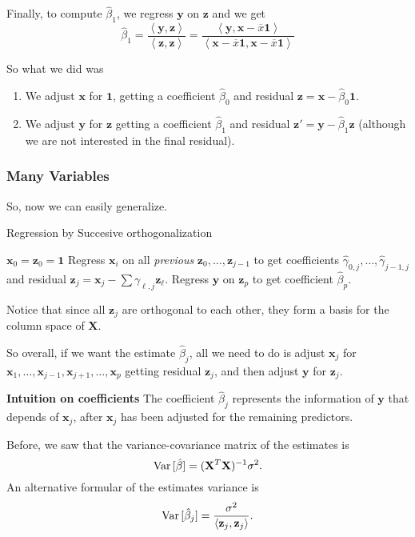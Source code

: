 \documentclass[11pt]{article}
\theoremstyle{definition}
\newcommand{\XX}{\mathbf{X}}
\newcommand{\xx}{\mathbf{x}}
\newcommand{\zz}{\mathbf{z}}
\newcommand{\yy}{\mathbf{y}}
\newcommand{\onevec}{\mathbf{1}}
\newcommand{\ip}[2]{\ensuremath{\left\langle#1, #2\right\rangle}}
\begin{document}
Finally, to compute $\hat\beta_1$, we regress $\yy$ on $\zz$ and we get
\[\hat\beta_1=\frac{\ip\yy\zz}{\ip\zz\zz}=\frac{\ip\yy{\xx-\overline{x}\onevec}}{\ip{\xx-\overline{x}\onevec}{\xx-\overline{x}\onevec}}\]

So what we did was
\begin{enumerate}
	\item We adjust $\xx$ for $\onevec$, getting a coefficient $\hat\beta_0$ and
	      residual $\zz=\xx-\hat\beta_0\onevec$.
	\item We adjust $\yy$ for $\zz$ getting a coefficient $\hat\beta_1$ and
	      residual $\zz'=\yy-\hat\beta_1\zz$ (although we are not interested in the
	      final residual).
\end{enumerate}

\subsubsection{Many Variables}
So, now we can easily generalize.
\begin{algorithm}
	\caption{Regression by Succesive orthogonalization}\label{alg:Gram-Schmidt}
	\begin{algorithmic}
		\State $\xx_0=\zz_0=\onevec$
		\State Regress $\xx_i$ on all \emph{previous} $\zz_0,\ldots,\zz_{j-1}$ 
		to get coefficients $\hat\gamma_{0,j},\ldots,\hat\gamma_{j-1,j}$ and
		residual $\zz_j=\xx_j-\sum \gamma_{\ell,j}\zz_\ell$.
		\EndFor
		\State Regress $\yy$ on $\zz_p$ to get coefficient $\hat\beta_p$.
	\end{algorithmic}
\end{algorithm}

Notice that since all $\zz_j$ are orthogonal to each other, they form a basis
for the column space of $\XX$.

So overall, if we want the estimate $\hat\beta_j$, all we need to do is adjust
$\xx_j$ for $\xx_1,\ldots,\xx_{j-1},\xx_{j+1},\ldots,\xx_p$ getting residual
$\zz_j$, and then adjust $\yy$ for $\zz_j$.

\begin{shaded}
	\textbf{Intuition on coefficients} \newline
	The coefficient $\hat\beta_j$ represents the information of $\yy$ that
	depends of $\xx_j$, after $\xx_j$ has been adjusted for the remaining
	predictors.
\end{shaded}

Before, we saw that the variance-covariance matrix of the estimates is
\[\Var{[\hat\beta]}=(\XX^T\XX)^{-1}\sigma^2.\]
An alternative formular of the estimates variance is 
\[\Var{[\hat\beta_j]}=\frac{\sigma^2}{\ip{\zz_j}{\zz_j}}.\]
\end{document}

